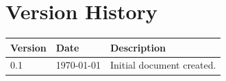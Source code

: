 \chapter*{Version History}

\begin{tabular}{|l|l|l|}
\hline
Version & Date & Description \\
\hline
0.1 & \today & Initial document created. \\
\hline
\end{tabular}

\clearpage